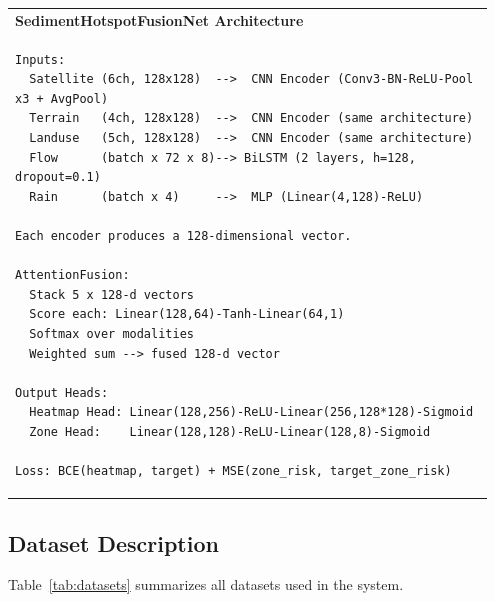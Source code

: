 \documentclass[twocolumn]{article}
\begin{document}
\vspace{0.5em}
\noindent\begin{minipage}{\linewidth}
\centering
\begin{tabular}{|p{0.95\linewidth}|}
\hline
\small
\textbf{SedimentHotspotFusionNet Architecture}\\[4pt]
\small
\begin{verbatim}
Inputs:
  Satellite (6ch, 128x128)  -->  CNN Encoder (Conv3-BN-ReLU-Pool x3 + AvgPool)
  Terrain   (4ch, 128x128)  -->  CNN Encoder (same architecture)
  Landuse   (5ch, 128x128)  -->  CNN Encoder (same architecture)
  Flow      (batch x 72 x 8)--> BiLSTM (2 layers, h=128, dropout=0.1)
  Rain      (batch x 4)     -->  MLP (Linear(4,128)-ReLU)
      
Each encoder produces a 128-dimensional vector.

AttentionFusion:
  Stack 5 x 128-d vectors
  Score each: Linear(128,64)-Tanh-Linear(64,1)
  Softmax over modalities
  Weighted sum --> fused 128-d vector

Output Heads:
  Heatmap Head: Linear(128,256)-ReLU-Linear(256,128*128)-Sigmoid
  Zone Head:    Linear(128,128)-ReLU-Linear(128,8)-Sigmoid

Loss: BCE(heatmap, target) + MSE(zone_risk, target_zone_risk)
\end{verbatim}\\
\hline
\end{tabular}
\label{fig:architecture}
\end{minipage}
\vspace{0.5em}

\subsection{Dataset Description}

Table~\ref{tab:datasets} summarizes all datasets used in the system.
\end{document}
